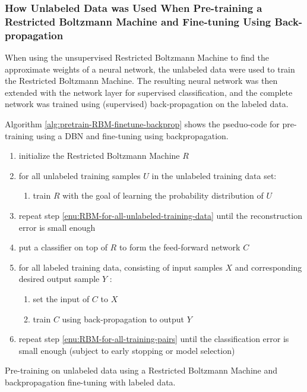 \subsubsection{How Unlabeled Data was Used When Pre-training a Restricted Boltzmann
Machine and Fine-tuning Using Back-propagation}

When using the unsupervised Restricted Boltzmann Machine to find the
approximate weights of a neural network, the unlabeled data were used
to train the Restricted Boltzmann Machine. The resulting neural network
was then extended with the network layer for supervised classification,
and the complete network was trained using (supervised) back-propagation
on the labeled data. 

Algorithm \ref{alg:pretrain-RBM-finetune-backprop} shows the pseduo-code
for pre-training using a DBN and fine-tuning using backpropagation.

\begin{algorithm}
\begin{enumerate}
\item initialize the Restricted Boltzmann Machine $R$
\item \label{enu:RBM-for-all-unlabeled-training-data}for all unlabeled
training samples $U$ in the unlabeled training data set:

\begin{enumerate}
\item train $R$ with the goal of learning the probability distribution
of $U$
\end{enumerate}
\item repeat step \ref{enu:RBM-for-all-unlabeled-training-data} until the
reconstruction error is small enough
\item put a classifier on top of $R$ to form the feed-forward network $C$
\item \label{enu:RBM-for-all-training-pairs}for all labeled training data,
consisting of input samples $X$ and corresponding desired output
sample $Y$ :

\begin{enumerate}
\item set the input of $C$ to $X$
\item train $C$ using back-propagation to output $Y$
\end{enumerate}
\item repeat step \ref{enu:RBM-for-all-training-pairs} until the classification
error is small enough (subject to early stopping or model selection)
\end{enumerate}
\caption{\label{alg:pretrain-RBM-finetune-backprop}Pre-training on unlabeled
data using a Restricted Boltzmann Machine and backpropagation fine-tuning
with labeled data.}
\end{algorithm}

